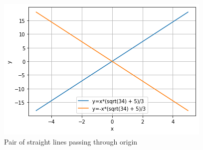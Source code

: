 \documentclass[journal,12pt,twocolumn]{IEEEtran}
\begin{document}
\renewcommand{\thefigure}{2}
\begin{figure}[h!]
    \centering
    \includegraphics[width=\columnwidth]{assignment3.1.png}
    \caption{Pair of straight lines passing through origin}
    \label{fig:fig2}
\end{figure}
\end{document}

